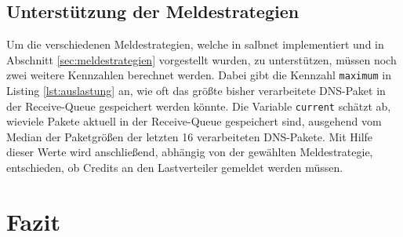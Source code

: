 \documentclass[a4paper, 12pt, BCOR10mm, DIV12, toc=bibliography, toc=listof, german]{scrbook}
\begin{document}
			
			
			
			

			\subsection*{Unterstützung der Meldestrategien} %

			Um die verschiedenen Meldestrategien, welche in salbnet implementiert und in Abschnitt
			\ref{sec:meldestrategien} vorgestellt wurden, zu unterstützen, müssen noch zwei weitere
			Kennzahlen berechnet werden. Dabei gibt die Kennzahl \texttt{maximum} in Listing
			\ref{lst:auslastung} an, wie oft das größte bisher verarbeitete DNS-Paket in der Receive-Queue
			gespeichert werden könnte. Die Variable \texttt{current} schätzt ab, wieviele Pakete aktuell
			in der Receive-Queue gespeichert sind, ausgehend vom Median der Paketgrößen der letzten 16
			verarbeiteten DNS-Pakete.  Mit Hilfe dieser Werte wird anschließend, abhängig von der
			gewählten Meldestrategie, entschieden, ob Credits an den Lastverteiler gemeldet werden müssen.

			



		\section{Fazit} %
		\label{sec:implementierung-fazit}
\end{document}
